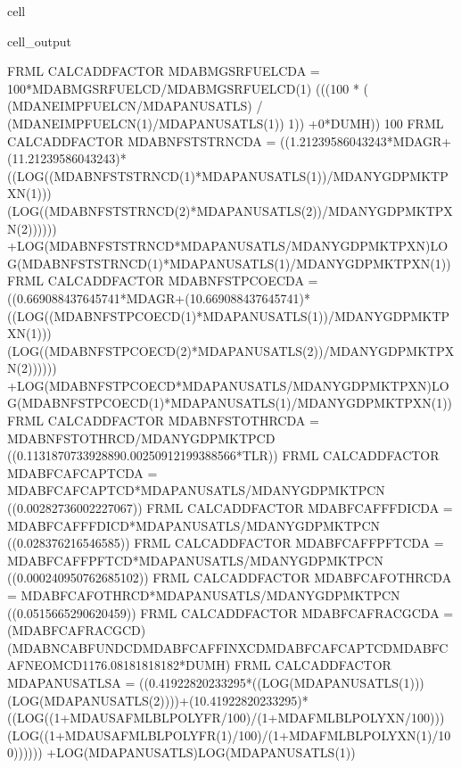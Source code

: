 \documentclass[letterpaper,10pt,english]{jupyterBook}
\begin{document}
\begin{sphinxuseclass}{cell}
\begin{sphinxVerbatimOutput}
\begin{sphinxuseclass}{cell_output}
\begin{sphinxVerbatim}[commandchars=\\\{\}]
FRML \PYGZlt{}CALC\PYGZus{}ADD\PYGZus{}FACTOR\PYGZgt{} MDABMGSRFUELCD\PYGZus{}A = 100*MDABMGSRFUELCD/MDABMGSRFUELCD(\PYGZhy{}1)\PYGZhy{} (((100 * ( (MDANEIMPFUELCN/MDAPANUSATLS) / (MDANEIMPFUELCN(\PYGZhy{}1)/MDAPANUSATLS(\PYGZhy{}1)) \PYGZhy{}1)) +0*DUMH)) \PYGZhy{}100\PYGZdl{}
FRML \PYGZlt{}CALC\PYGZus{}ADD\PYGZus{}FACTOR\PYGZgt{} MDABNFSTSTRNCD\PYGZus{}A = \PYGZhy{} ((1.21239586043243*MDAGR+(1\PYGZhy{}1.21239586043243)*((LOG((MDABNFSTSTRNCD(\PYGZhy{}1)*MDAPANUSATLS(\PYGZhy{}1))/MDANYGDPMKTPXN(\PYGZhy{}1)))\PYGZhy{}(LOG((MDABNFSTSTRNCD(\PYGZhy{}2)*MDAPANUSATLS(\PYGZhy{}2))/MDANYGDPMKTPXN(\PYGZhy{}2)))))) +LOG(MDABNFSTSTRNCD*MDAPANUSATLS/MDANYGDPMKTPXN)\PYGZhy{}LOG(MDABNFSTSTRNCD(\PYGZhy{}1)*MDAPANUSATLS(\PYGZhy{}1)/MDANYGDPMKTPXN(\PYGZhy{}1))\PYGZdl{}
FRML \PYGZlt{}CALC\PYGZus{}ADD\PYGZus{}FACTOR\PYGZgt{} MDABNFSTPCOECD\PYGZus{}A = \PYGZhy{} ((0.669088437645741*MDAGR+(1\PYGZhy{}0.669088437645741)*((LOG((MDABNFSTPCOECD(\PYGZhy{}1)*MDAPANUSATLS(\PYGZhy{}1))/MDANYGDPMKTPXN(\PYGZhy{}1)))\PYGZhy{}(LOG((MDABNFSTPCOECD(\PYGZhy{}2)*MDAPANUSATLS(\PYGZhy{}2))/MDANYGDPMKTPXN(\PYGZhy{}2)))))) +LOG(MDABNFSTPCOECD*MDAPANUSATLS/MDANYGDPMKTPXN)\PYGZhy{}LOG(MDABNFSTPCOECD(\PYGZhy{}1)*MDAPANUSATLS(\PYGZhy{}1)/MDANYGDPMKTPXN(\PYGZhy{}1))\PYGZdl{}
FRML \PYGZlt{}CALC\PYGZus{}ADD\PYGZus{}FACTOR\PYGZgt{} MDABNFSTOTHRCD\PYGZus{}A = MDABNFSTOTHRCD/MDANYGDPMKTPCD\PYGZhy{} ((0.113187073392889\PYGZhy{}0.00250912199388566*T\PYGZus{}LR)) \PYGZdl{}
FRML \PYGZlt{}CALC\PYGZus{}ADD\PYGZus{}FACTOR\PYGZgt{} MDABFCAFCAPTCD\PYGZus{}A = MDABFCAFCAPTCD*MDAPANUSATLS/MDANYGDPMKTPCN\PYGZhy{} ((0.00282736002227067)) \PYGZdl{}
FRML \PYGZlt{}CALC\PYGZus{}ADD\PYGZus{}FACTOR\PYGZgt{} MDABFCAFFFDICD\PYGZus{}A = MDABFCAFFFDICD*MDAPANUSATLS/MDANYGDPMKTPCN\PYGZhy{} ((\PYGZhy{}0.028376216546585)) \PYGZdl{}
FRML \PYGZlt{}CALC\PYGZus{}ADD\PYGZus{}FACTOR\PYGZgt{} MDABFCAFFPFTCD\PYGZus{}A = MDABFCAFFPFTCD*MDAPANUSATLS/MDANYGDPMKTPCN\PYGZhy{} ((\PYGZhy{}0.000240950762685102)) \PYGZdl{}
FRML \PYGZlt{}CALC\PYGZus{}ADD\PYGZus{}FACTOR\PYGZgt{} MDABFCAFOTHRCD\PYGZus{}A = MDABFCAFOTHRCD*MDAPANUSATLS/MDANYGDPMKTPCN\PYGZhy{} ((\PYGZhy{}0.0515665290620459)) \PYGZdl{}
FRML \PYGZlt{}CALC\PYGZus{}ADD\PYGZus{}FACTOR\PYGZgt{} MDABFCAFRACGCD\PYGZus{}A = (MDABFCAFRACGCD) \PYGZhy{} (\PYGZhy{}MDABNCABFUNDCD\PYGZhy{}MDABFCAFFINXCD\PYGZhy{}MDABFCAFCAPTCD\PYGZhy{}MDABFCAFNEOMCD\PYGZhy{}1176.08181818182*DUMH)\PYGZdl{}
FRML \PYGZlt{}CALC\PYGZus{}ADD\PYGZus{}FACTOR\PYGZgt{} MDAPANUSATLS\PYGZus{}A = \PYGZhy{} ((0.41922820233295*((LOG(MDAPANUSATLS(\PYGZhy{}1)))\PYGZhy{}(LOG(MDAPANUSATLS(\PYGZhy{}2))))+(1\PYGZhy{}0.41922820233295)*((LOG((1+MDAUSAFMLBLPOLYFR/100)/(1+MDAFMLBLPOLYXN/100)))\PYGZhy{}(LOG((1+MDAUSAFMLBLPOLYFR(\PYGZhy{}1)/100)/(1+MDAFMLBLPOLYXN(\PYGZhy{}1)/100)))))) +LOG(MDAPANUSATLS)\PYGZhy{}LOG(MDAPANUSATLS(\PYGZhy{}1))\PYGZdl{}

\end{sphinxVerbatim}
\end{sphinxuseclass}
\end{sphinxVerbatimOutput}
\end{sphinxuseclass}
\end{document}
